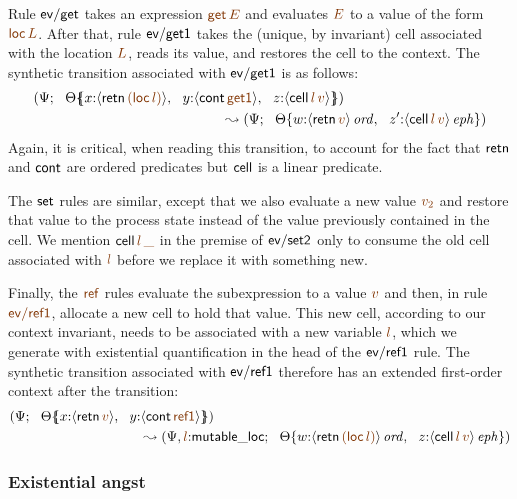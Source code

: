 Rule ${\sf ev/get}$ takes an expression $\lf{{\sf get}\,E}$ and evaluates 
$\lf E$ to a value of the form $\lf{{\sf loc}\,L}$. After that, rule
${\sf ev/get1}$ takes the (unique, by invariant) cell associated
with the location $\lf L$, reads its value, and restores the cell to the
context. The synthetic transition associated with ${\sf ev/get1}$ is 
as follows:
\begin{align*}
(\Psi&;  ~~ \frameoff{\Theta}{x{:}{\susp{{\sf retn}\,\lf{({\sf loc}\,l)}}},
 ~~ y{:}{\susp{{\sf cont}\,\lf{\sf get1}}}, 
 ~~ z{:}{\susp{{\sf cell}\,\lf{l}\,\lf{v}}}})\\
& \qquad \qquad\qquad\qquad\qquad\qquad~ \leadsto 
(\Psi; ~~ \tackon{\Theta}{w{:}\istrue{\susp{{\sf retn}\,\lf{v}}},
 ~~ z'{:}\iseph{\susp{{\sf cell}\,\lf{l}\,\lf{v}}}})
\end{align*}
Again, it is critical, when reading this transition, to account for the fact
that ${\sf retn}$ and ${\sf cont}$ are ordered predicates but ${\sf
  cell}$ is a linear predicate.

The ${\sf set}$ rules are similar, except that we also evaluate a new value
$\lf{v_2}$ and restore that 
value to the process state instead of the value previously
contained in the cell. We mention ${\sf cell}\,\lf{l}\,\lf{\_}$ in the
premise of ${\sf ev/set2}$ only to consume the old cell associated with 
$\lf{l}$
before we replace it with something new.

Finally, the $\lf{\sf ref}$ rules evaluate the subexpression to a value
$\lf{v}$ and then, in rule $\lf{\sf ev/ref1}$, allocate a new cell to hold
that value. This new cell, according to our context invariant, needs
to be associated with a new variable $\lf{l}$, which we generate with
existential quantification in the head of the ${\sf ev/ref1}$ rule.
The synthetic transition associated with ${\sf ev/ref1}$ therefore has
an extended first-order context after the transition:
\begin{align*}
(\Psi&; ~~ \frameoff{\Theta}{x{:}\susp{{\sf retn}\,\lf{v}}, ~~ y{:}\susp{{\sf cont}\,\lf{\sf ref1}}})
\\
& \qquad\qquad\qquad\qquad~\leadsto 
(\Psi, \lf{l}{:}{\sf mutable\_loc}; ~~ \tackon{\Theta}{w{:}\istrue{\susp{{\sf retn}\,\lf{({\sf loc}\,l)}}}, ~~
z{:}\iseph{\susp{{\sf cell}\,\lf{l}\,\lf{v}}}})
\end{align*}

\subsubsection{Existential angst} 

